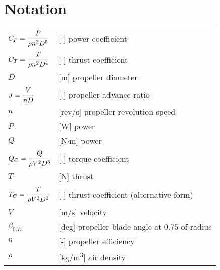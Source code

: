 \clearpage %
{}
\chapter*{Notation}
\markright{}

\begin{longtable}[l]{ l p{} }
  $C_P=\cfrac{P}{\rho n^3 D^5}$ & [-] power coefficient \\
  $C_T=\cfrac{T}{\rho n^2 D^4}$ & [-] thrust coefficient \\
  $D$                           & [m] propeller diameter \\
  $J=\cfrac{V}{nD}$             & [-] propeller advance ratio \\
  $n$                           & [rev/s] propeller revolution speed \\
  $P$                           & [W] power \\
  $Q$                           & [N$\cdot$m] power \\
  $Q_C=\cfrac{Q}{\rho V^2 D^3}$ & [-] torque coefficient \\
  $T$                           & [N] thrust \\
  $T_C=\cfrac{T}{\rho V^2 D^2}$ & [-] thrust coefficient (alternative form) \\
  $V$                           & [m/s] velocity \\
  $\beta_{0.75}$                & [deg] propeller blade angle at 0.75 of radius \\
  $\eta$                        & [-] propeller efficiency \\
  $\rho$                        & [kg/m\textsuperscript{3}] air density \\
\end{longtable}
